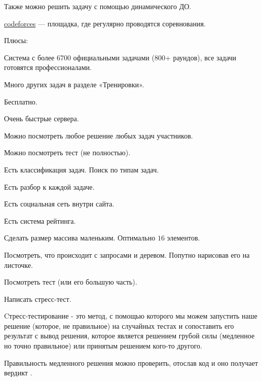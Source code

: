 Также можно решить задачу с помощью динамического ДО.


\href{https://codeforces.com}{codeforces} --- площадка, где регулярно проводятся соревнования.

Плюсы:
\up \up
\begin{MyList}[0pt]
	\item Система с более 6700 официальными задачами (800+ раундов), все задачи готовятся профессионалами.
	\item Много других задач в разделе «Тренировки».
	\item Бесплатно.
	\item Очень быстрые сервера.
	\item Можно посмотреть любое решение любых задач участников.
	\item Можно посмотреть тест (не полностью).
	\item Есть классификация задач. Поиск по типам задач. 
	\item Есть разбор к каждой задаче.
	\item Есть социальная сеть внутри сайта.
	\item Есть система рейтинга.
\end{MyList} \up \up


\up \up
\begin{MyList}[0pt]
	\item Сделать размер массива маленьким. Оптимально $16$ элементов.
	\item Посмотреть, что происходит с запросами и деревом. Попутно нарисовав его на листочке.
	\item Посмотреть тест (или его большую часть).
	\item Написать стресс-тест.
\end{MyList} \up \up


Cтресс-тестирование - это метод, с помощью которого мы можем запустить наше решение (которое, не правильное) на случайных тестах и сопоставить его результат с вывод решения, которое является решением грубой силы (медленное но точно правильное) или принятым решением кого-то другого.

Правильность медленного решения можно проверить, отослав код и оно получает вердикт .


